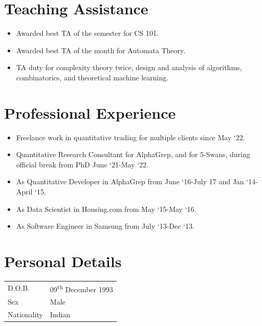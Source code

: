 \documentclass[a4paper,10pt]{article}
\begin{document}
\section{Teaching Assistance}

\begin{itemize}
  \item Awarded best TA of the semester for CS 101.
  \item Awarded best TA of the month for Automata Theory.
  \item TA duty for complexity theory twice, design and analysis of algorithms, combinatorics, and theoretical machine learning.
\end{itemize}

\section{Professional Experience}

\begin{itemize}
  \item Freelance work in quantitative trading for multiple clients since May `22.
  \item Quantitative Research Consultant for AlphaGrep, and for 5-Swans, during official break from PhD June `21-May `22.
  \item As Quantitative Developer in AlphaGrep from June `16-July 17 and Jan `14-April `15.
  \item As Data Scientist in Housing.com from May `15-May `16.
  \item As Software Engineer in Samsung from July `13-Dec `13.
\end{itemize}

\section{Personal Details}

\begin{tabular}{ll}
  D.O.B. & 09\textsuperscript{th} December 1993 \\
  Sex & Male \\
  Nationality & Indian
\end{tabular}
\end{document}
